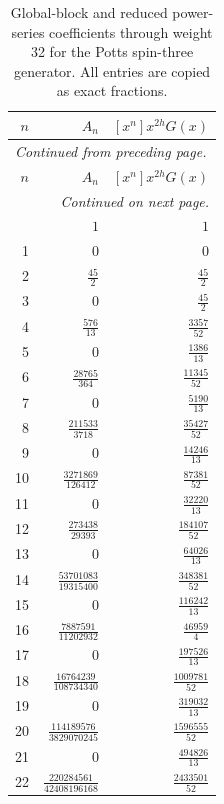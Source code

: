 \begingroup\small
\setlength{\tabcolsep}{5pt}
\begin{longtable}{rrr}
\caption{Global-block and reduced power-series coefficients through weight 32 for the Potts spin-three generator. All entries are copied as exact fractions.}\label{expphysics:blocks-Potts}\\
\toprule
$n$ & $A_n$ & $[x^n]x^{2h}G(x)$\\
\midrule
\endfirsthead
\multicolumn{3}{l}{\small\itshape Continued from preceding page.}\\
\toprule
$n$ & $A_n$ & $[x^n]x^{2h}G(x)$\\
\midrule
\endhead
\midrule
\multicolumn{3}{r}{\small\itshape Continued on next page.}\\
\endfoot
\bottomrule
\endlastfoot
0 & $1$ & $1$\\
1 & $0$ & $0$\\
2 & $\frac{45}{2}$ & $\frac{45}{2}$\\
3 & $0$ & $\frac{45}{2}$\\
4 & $\frac{576}{13}$ & $\frac{3357}{52}$\\
5 & $0$ & $\frac{1386}{13}$\\
6 & $\frac{28765}{364}$ & $\frac{11345}{52}$\\
7 & $0$ & $\frac{5190}{13}$\\
8 & $\frac{211533}{3718}$ & $\frac{35427}{52}$\\
9 & $0$ & $\frac{14246}{13}$\\
10 & $\frac{3271869}{126412}$ & $\frac{87381}{52}$\\
11 & $0$ & $\frac{32220}{13}$\\
12 & $\frac{273438}{29393}$ & $\frac{184107}{52}$\\
13 & $0$ & $\frac{64026}{13}$\\
14 & $\frac{53701083}{19315400}$ & $\frac{348381}{52}$\\
15 & $0$ & $\frac{116242}{13}$\\
16 & $\frac{7887591}{11202932}$ & $\frac{46959}{4}$\\
17 & $0$ & $\frac{197526}{13}$\\
18 & $\frac{16764239}{108734340}$ & $\frac{1009781}{52}$\\
19 & $0$ & $\frac{319032}{13}$\\
20 & $\frac{114189576}{3829070245}$ & $\frac{1596555}{52}$\\
21 & $0$ & $\frac{494826}{13}$\\
22 & $\frac{220284561}{42408196168}$ & $\frac{2433501}{52}$\\

\end{longtable}

